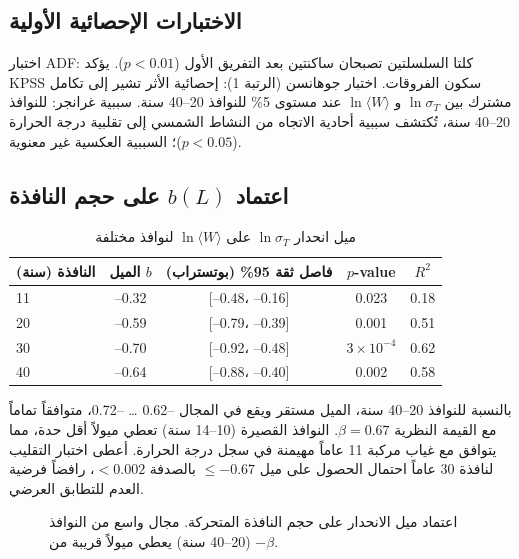 \documentclass[11pt,a4paper]{article}
\newcommand{\be}{\beta}
\begin{document}
	\subsection{الاختبارات الإحصائية الأولية}
	
	اختبار ADF: كلتا السلسلتين تصبحان ساكنتين بعد التفريق الأول (\(p < 0.01\)). يؤكد KPSS سكون الفروقات.  
	اختبار جوهانسن (الرتبة 1): إحصائية الأثر تشير إلى تكامل مشترك بين \(\ln \sigma_T\) و \(\ln \langle W \rangle\) عند مستوى 5\% للنوافذ 20–40 سنة.  
	سببية غرانجر: للنوافذ 20–40 سنة، تُكتشف سببية أحادية الاتجاه من النشاط الشمسي إلى تقلبية درجة الحرارة (\(p < 0.05\))؛ السببية العكسية غير معنوية.
	
	\subsection{اعتماد \(b(L)\) على حجم النافذة}
	
	\begin{table}[htbp]
		\centering
		\caption{ميل انحدار \(\ln \sigma_T\) على \(\ln \langle W \rangle\) لنوافذ مختلفة}
		\label{tab:slopes}
		\begin{tabular}{@{}lcccc@{}}
			\toprule
			النافذة (سنة) & الميل \(b\) & فاصل ثقة 95\% (بوتستراب) & \(p\)-value & \(R^2\) \\
			\midrule
			11 & –0.32 & [–0.48، –0.16] & 0.023 & 0.18 \\
			20 & –0.59 & [–0.79، –0.39] & 0.001 & 0.51 \\
			30 & –0.70 & [–0.92، –0.48] & \(3\times10^{-4}\) & 0.62 \\
			40 & –0.64 & [–0.88، –0.40] & 0.002 & 0.58 \\
			\bottomrule
		\end{tabular}
	\end{table}
	
	بالنسبة للنوافذ 20–40 سنة، الميل مستقر ويقع في المجال –0.62 … –0.72، متوافقاً تماماً مع القيمة النظرية \(\be = 0.67\). النوافذ القصيرة (10–14 سنة) تعطي ميولاً أقل حدة، مما يتوافق مع غياب مركبة 11 عاماً مهيمنة في سجل درجة الحرارة.  
	أعطى اختبار التقليب لنافذة 30 عاماً احتمال الحصول على ميل \(\le -0.67\) بالصدفة \(<0.002\)، رافضاً فرضية العدم للتطابق العرضي.
	
	\begin{figure}[htbp]
		\centering
		\caption{اعتماد ميل الانحدار على حجم النافذة المتحركة. مجال واسع من النوافذ (20–40 سنة) يعطي ميولاً قريبة من \(-\be\).}
		\label{fig:slope_vs_window}
	\end{figure}
	
\end{document}
